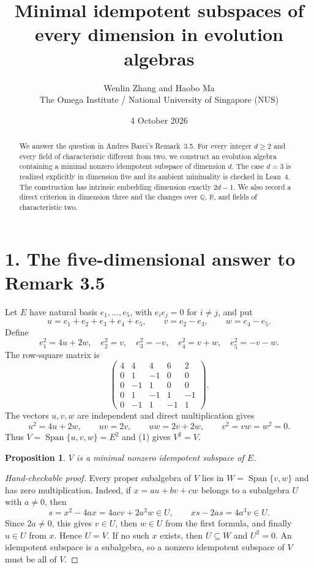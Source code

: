 \documentclass[11pt]{article}
\title{Minimal idempotent subspaces of every dimension in evolution algebras}
\author{Wenlin Zhang and Haobo Ma\\The Omega Institute / National University of Singapore (NUS)}
\date{4 October 2026}
\newtheorem{proposition}[theorem]{Proposition}
\newcommand{\Span}{\operatorname{Span}}
\begin{document}
\maketitle

\begin{abstract}
We answer the question in Andres Barei's Remark~3.5.  For every integer
$d\geq 2$ and every field of characteristic different from two, we construct
an evolution algebra containing a minimal nonzero idempotent subspace of
dimension $d$.  The case $d=3$ is realized explicitly in dimension five and
its ambient minimality is checked in Lean~4.  The construction has intrinsic
embedding dimension exactly $2d-1$.  We also record a direct criterion in
dimension three and the changes over $\mathbb Q$, $\mathbb R$, and fields of
characteristic two.
\end{abstract}

\section*{1. The five-dimensional answer to Remark 3.5}
Let $E$ have natural basis $e_1,\ldots,e_5$, with $e_i e_j=0$ for $i\ne j$,
and put
\[
 u=e_1+e_2+e_3+e_4+e_5,\qquad v=e_2-e_3,\qquad w=e_4-e_5.
\]
Define
\[
 e_1^2=4u+2w,\quad e_2^2=v,\quad e_3^2=-v,\quad
 e_4^2=v+w,\quad e_5^2=-v-w.
\]
The row-square matrix is
\[
\begin{pmatrix}4&4&4&6&2\\0&1&-1&0&0\\0&-1&1&0&0\\
0&1&-1&1&-1\\0&-1&1&-1&1\end{pmatrix}.
\]
The vectors $u,v,w$ are independent and direct multiplication gives
\[
 u^2=4u+2w,\qquad uv=2v,\qquad uw=2v+2w,
 \qquad v^2=vw=w^2=0.                                      \tag{1}
\]
Thus $V=\Span\{u,v,w\}=E^2$ and (1) gives $V^2=V$.

\begin{proposition}
$V$ is a minimal nonzero idempotent subspace of $E$.
\end{proposition}
\begin{proof}[Hand-checkable proof]
Every proper subalgebra of $V$ lies in $W=\Span\{v,w\}$ and has zero
multiplication.  Indeed, if $x=au+bv+cw$ belongs to a subalgebra $U$ with
$a\ne0$, then
\[
 s=x^2-4ax=4acv+2a^2w\in U,\qquad xs-2as=4a^3v\in U.
\]
Since $2a\ne0$, this gives $v\in U$, then $w\in U$ from the first formula,
and finally $u\in U$ from $x$.  Hence $U=V$.  If no such $x$ exists, then
$U\subseteq W$ and $U^2=0$.  An idempotent subspace is a subalgebra, so a
nonzero idempotent subspace of $V$ must be all of $V$.
\end{proof}
\end{document}
